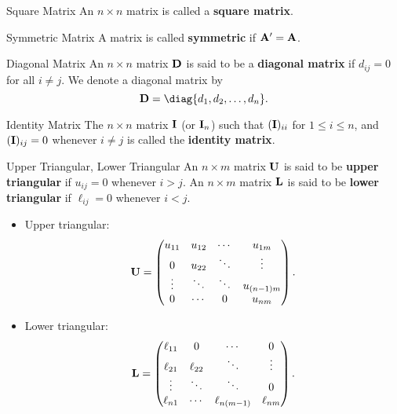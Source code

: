 \begin{Definition}{Square Matrix}{}
    An $ n\times n $ matrix is called a \textbf{square matrix}.
\end{Definition}
\begin{Definition}{Symmetric Matrix}{}
    A matrix is called \textbf{symmetric} if $ \mathbf{A}'=\mathbf{A} $.
\end{Definition}
\begin{Definition}{Diagonal Matrix}{}
    An $ n\times n $ matrix $ \mathbf{D} $ is said to be a \textbf{diagonal matrix} if $ d_{ij}=0 $ for all $ i\ne j $. We denote
    a diagonal matrix by
    \[ \Matrix{D}=\diag{d_{1},d_{2},\ldots,d_{n}}. \]
\end{Definition}
\begin{Definition}{Identity Matrix}{}
    The $ n\times n $ matrix $ \mathbf{I} $ (or $ \mathbf{I}_n $) such that
    $ (\mathbf{I})_{ii} $ for $ 1\le i\le n $, and $ (\mathbf{I})_{ij}=0 $ whenever
    $ i\ne j $ is called the \textbf{identity matrix}.
\end{Definition}
\begin{Definition}{Upper Triangular, Lower Triangular}{}
    An $ n\times m $ matrix $ \mathbf{U} $ is said to be \textbf{upper triangular} if $ u_{ij}=0 $ whenever $ i>j $. An
    $ n\times m $ matrix $ \mathbf{L} $ is said to be \textbf{lower triangular} if $ \ell_{ij}=0 $ whenever $ i<j $.
    \begin{itemize}
        \item Upper triangular:
              \[ \mathbf{U}=\begin{pmatrix}
                      u_{11} & u_{12} & \cdots & u_{1m}     \\
                      0      & u_{22} & \ddots & \vdots     \\
                      \vdots & \ddots & \ddots & u_{(n-1)m} \\
                      0      & \cdots & 0      & u_{nm}
                  \end{pmatrix}. \]
        \item Lower triangular:
              \[ \mathbf{L}=\begin{pmatrix}
                      \ell_{11} & 0         & \cdots        & 0         \\
                      \ell_{21} & \ell_{22} & \ddots        & \vdots    \\
                      \vdots    & \ddots    & \ddots        & 0         \\
                      \ell_{n1} & \cdots    & \ell_{n(m-1)} & \ell_{nm}
                  \end{pmatrix}. \]
    \end{itemize}
\end{Definition}

